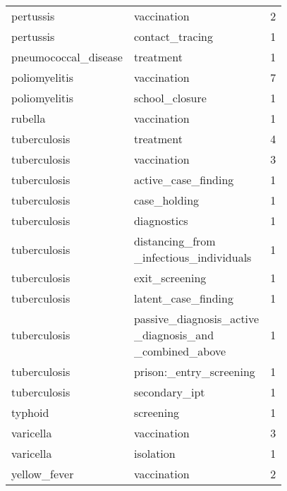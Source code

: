 \documentclass[
]{article}
\begin{document}
\begin{longtable}{llr}
pertussis & vaccination & 2\\
 
pertussis & contact\_tracing & 1\\
 
pneumococcal\_disease & treatment & 1\\
 
poliomyelitis & vaccination & 7\\
 
poliomyelitis & school\_closure & 1\\
 
rubella & vaccination & 1\\
 
tuberculosis & treatment & 4\\
 
tuberculosis & vaccination & 3\\
 
tuberculosis & active\_case\_finding & 1\\
 
tuberculosis & case\_holding & 1\\
 
tuberculosis & diagnostics & 1\\
 
tuberculosis & 
\makecell[l]{
	distancing\_from\\
	\_infectious\_individuals
} & 
1\\
 
tuberculosis & exit\_screening & 1\\
 
tuberculosis & latent\_case\_finding & 1\\
 
tuberculosis &
\makecell[l]{
	passive\_diagnosis\_active\\
	\_diagnosis\_and\\
	\_combined\_above
} & 1\\
 
tuberculosis & prison:\_entry\_screening & 1\\
 
tuberculosis & secondary\_ipt & 1\\
 
typhoid & screening & 1\\
 
varicella & vaccination & 3\\
 
varicella & isolation & 1\\
 
yellow\_fever & vaccination & 2\\
\bottomrule
\end{longtable}
\end{document}
